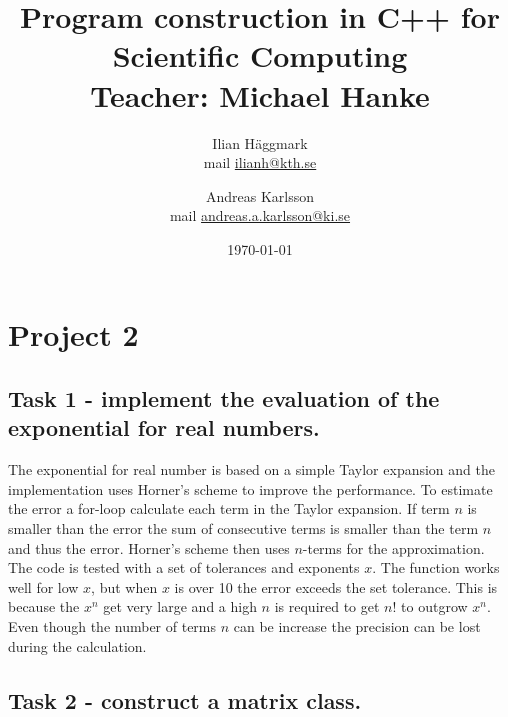 \documentclass[paper=a4, fontsize=11pt]{article} %
\title{Program construction in C++ for Scientific Computing \\ Teacher: Michael Hanke}
\author{Ilian H{\"a}ggmark \\ mail \href{mailto:ilianh@kth.se}{ilianh@kth.se}
  \and Andreas Karlsson \\ mail \href{mailto:andreas.a.karlsson@ki.se}{andreas.a.karlsson@ki.se} }
\date{\normalsize\today} %
\begin{document}
\maketitle %

\section{Project 2}
\subsection{Task 1 - implement the evaluation of the exponential for real numbers.}

The exponential for real number is based on a simple Taylor expansion and the implementation uses Horner’s scheme to improve the performance.
To estimate the error a for-loop calculate each term in the Taylor expansion. If term $n$ is smaller than the error the sum of consecutive terms is smaller than the term $n$ and thus the error. Horner’s scheme then uses $n$-terms for the approximation.
The code is tested with a set of tolerances and exponents $x$. The function works well for low $x$, but when $x$ is over 10 the error exceeds the set tolerance. This is because the $x^n$ get very large and a high $n$ is required to get $n!$ to outgrow $x^n$. Even though the number of terms $n$ can be increase the precision can be lost during the calculation. 


\subsection{Task 2 - construct a matrix class.}
\end{document}
